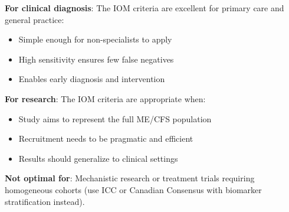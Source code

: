 \begin{observation}
\label{obs:iom-application}
\textbf{For clinical diagnosis}: The IOM criteria are excellent for primary care and general practice:
\begin{itemize}
    \item Simple enough for non-specialists to apply
    \item High sensitivity ensures few false negatives
    \item Enables early diagnosis and intervention
\end{itemize}

\textbf{For research}: The IOM criteria are appropriate when:
\begin{itemize}
    \item Study aims to represent the full ME/CFS population
    \item Recruitment needs to be pragmatic and efficient
    \item Results should generalize to clinical settings
\end{itemize}

\textbf{Not optimal for}: Mechanistic research or treatment trials requiring homogeneous cohorts (use ICC or Canadian Consensus with biomarker stratification instead).
\end{observation}


